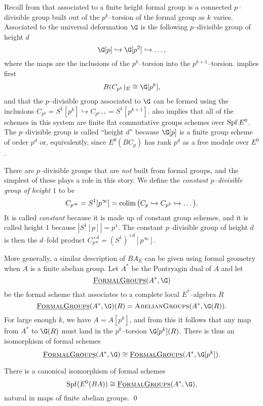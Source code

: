 Recall from  that associated to a finite height formal group is a connected $p$--divisible group built out of the $p^k$--torsion of the formal group as $k$ varies. Associated to the universal deformation $\G$ is the following $p$--divisible group of height $d$
\[
\G[p] \hookrightarrow \G[p^2] \hookrightarrow \ldots,
\]
where the maps are the inclusions of the $p^k$--torsion into the $p^{k+1}$--torsion.   implies first 
\[
B(C_{p^k})_{E} \cong \G[p^k],
\]
and that the $p$--divisible group associated to $\G$ can be formed using the inclusions $C_{p^k} = S^1[p^k] \hookrightarrow C_{p^{k+1}} = S^1[p^{k+1}]$. 
 also implies that all of the schemes in this system are finite flat commutative groups schemes over $\operatorname{Spf} E^0$. The $p$--divisible group is called ``height $d$'' because $\G[p]$ is a finite group scheme of order $p^d$ or, equivalently, since $E^0(BC_p)$ has rank $p^d$ as a free module over $E^0$.

There are $p$--divisible groups that are \emph{not} built from formal groups, and the simplest of these plays a role in this story. We define the \textit{constant $p$--divisible group of height $1$} to be 
\[
C_{p^{\infty}} = S^1[p^\infty] = \operatorname*{colim} \big ( C_p \hookrightarrow C_{p^2} \hookrightarrow \ldots \big ).
\]
It is called \textit{constant} because it is made up of constant group schemes, and it is called height $1$ because $|S^1[p]| = p^1$.  The constant $p$--divisible group of height $d$ is then the $d$--fold product $C_{p^\infty}^{\times d} = (S^1)^{\times d}[p^\infty]$.

More generally, a similar description of $BA_{E}$ can be given using formal geometry when $A$ is a finite abelian group. Let $A^*$ be the Pontryagin dual of $A$ and let
\[
\InternalHom{FormalGroups}(A^*, \G)
\]
be the formal scheme that associates to a complete local $E^*$--algebra $R$
\[
\InternalHom{FormalGroups}(A^*, \G)(R) = \CatOf{AbelianGroups}(A^*, \G(R)).
\]
For large enough $k$, we have $A = A[p^k]$, and from this it follows that any map from $A^*$ to $\G(R)$ must land in the $p^k$--torsion $\G[p^k](R)$.  There is thus an isomorphism of formal schemes
\[
\InternalHom{FormalGroups}(A^*, \G) \cong \InternalHom{FormalGroups}(A^*, \G[p^k]).
\]
\begin{proposition} \label{app:abeliangroupdualhom}
There is a canonical isomorphism of formal schemes
\[
\Spf(E^0(BA)) \cong \InternalHom{FormalGroups}(A^*, \G),
\]
natural in maps of finite abelian groups. \qed
\end{proposition}



